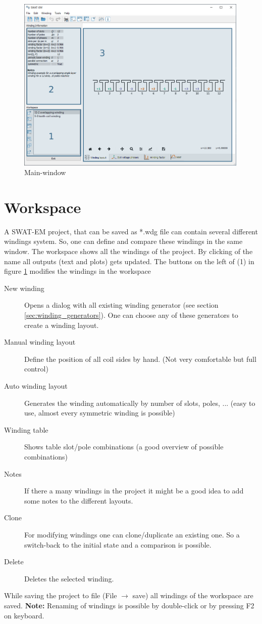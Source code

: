 \documentclass[]{scrreprt}
\begin{document}
%
\begin{figure}[htpb]
    \centering
    \includegraphics[width=0.99\textwidth,angle=0]{fig/mainwindow}
    \caption{Main-window}
    \label{fig:mainwindow}
\end{figure}
%
\section{Workspace}
A SWAT-EM project, that can be saved as *.wdg file can contain several different windings system.
So, one can define and compare these windings in the same window. The workspace shows all
the windings of the project. By clicking of the name all outputs (text and plots) gets updated.
The buttons on the left of (1) in figure \ref{fig:mainwindow} modifies the windings in the workspace
\begin{description}
 \item[New winding] Opens a dialog with all existing winding generator (see section \ref{sec:winding_generators}). 
		    One can choose any of these generators to create a winding layout.
 \item[Manual winding layout] Define the position of all coil sides by hand. (Not very comfortable
		    but full control)
 \item[Auto winding layout] Generates the winding automatically by number of slots, poles, ... (easy
                            to use, almost every symmetric winding is possible)
 \item[Winding table] Shows table slot/pole combinations (a good overview of possible combinations) 
 \item[Notes] If there a many windings in the project it might be a good idea to add some notes
              to the different layouts.
 \item[Clone] For modifying windings one can clone/duplicate an existing one. So a switch-back to the 
              initial state and a comparison is possible.
 \item[Delete] Deletes the selected winding.
\end{description}
%
While saving the project to file (File $\rightarrow$ save) all windings of the workspace are saved. 
\textbf{Note:} Renaming of windings is possible by double-click or by pressing F2 on keyboard.
%
%
\end{document}
